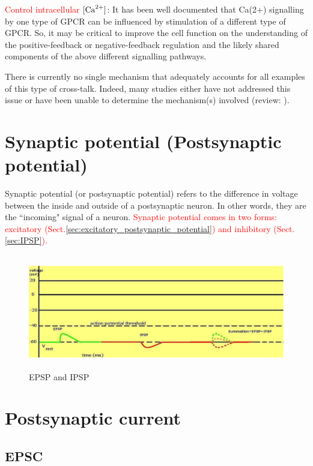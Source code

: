 \textcolor{red}{Control intracellular $[{\text{Ca}^{2+}}]$}:
It has been well documented that Ca(2+) signalling by one type of GPCR can be
influenced by stimulation of a different type of GPCR.
So, it may be critical to improve the cell function on the understanding of the
positive-feedback or negative-feedback regulation and the likely shared
components of the above different signalling pathways.

There is currently no single mechanism that adequately accounts for all examples
of this type of cross-talk. Indeed, many studies either have not addressed this
issue or have been unable to determine the mechanism(s) involved
(review: \citep{werry2003}).


\section{Synaptic potential (Postsynaptic potential)}
\label{sec:postsynaptic_potential}
\label{sec:synaptic_potential}

Synaptic potential (or postsynaptic potential) refers to the difference in
voltage between the inside and outside of a postsynaptic neuron. In other words,
they are the ``incoming" signal of a neuron. \textcolor{red}{Synaptic potential
comes in two forms: excitatory
(Sect.\ref{sec:excitatory_postsynaptic_potential}) and inhibitory
(Sect.\ref{sec:IPSP}).}


\begin{figure}[htb]
  \centerline{\includegraphics[height=5cm]{./images/EPSP_IPSP.eps}}
\caption{EPSP and IPSP}
\label{fig:EPSP_IPSP}
\end{figure} 

\section{Postsynaptic current}
\label{sec:postsynaptic-current}



\subsection{EPSC}
\label{sec:EPSC}

